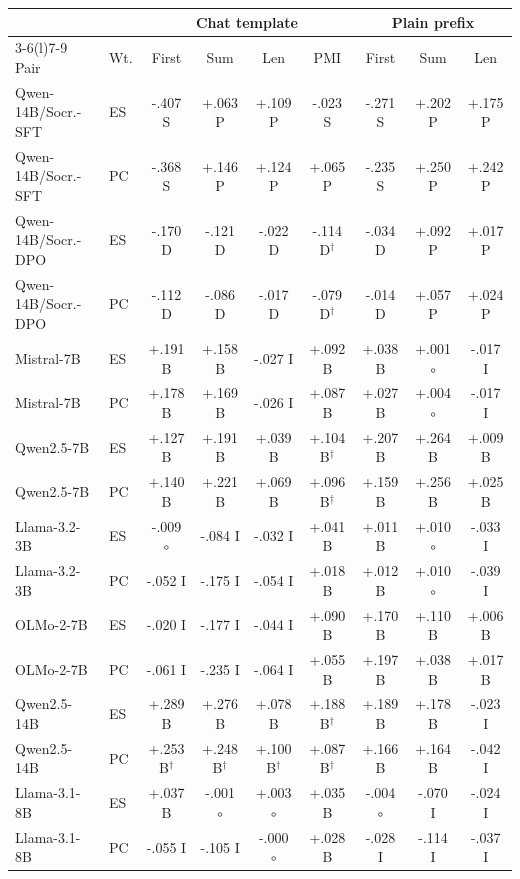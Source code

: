 \begin{table}[t]
\centering\scriptsize
\setlength{\tabcolsep}{3pt}
\begin{tabular}{@{}llccccccc@{}}
\toprule
& & \multicolumn{4}{c}{Chat template} & \multicolumn{3}{c}{Plain prefix} \\
\cmidrule(lr){3-6}\cmidrule(l){7-9}
Pair & Wt. & First & Sum & Len & PMI & First & Sum & Len \\
\midrule
Qwen-14B/Socr.-SFT & ES & -.407 S & +.063 P & +.109 P & -.023 S & -.271 S & +.202 P & +.175 P \\
Qwen-14B/Socr.-SFT & PC & -.368 S & +.146 P & +.124 P & +.065 P & -.235 S & +.250 P & +.242 P \\
Qwen-14B/Socr.-DPO & ES & -.170 D & -.121 D & -.022 D & -.114 D$^{\dagger}$ & -.034 D & +.092 P & +.017 P \\
Qwen-14B/Socr.-DPO & PC & -.112 D & -.086 D & -.017 D & -.079 D$^{\dagger}$ & -.014 D & +.057 P & +.024 P \\
Mistral-7B & ES & +.191 B & +.158 B & -.027 I & +.092 B & +.038 B & +.001 $\circ$ & -.017 I \\
Mistral-7B & PC & +.178 B & +.169 B & -.026 I & +.087 B & +.027 B & +.004 $\circ$ & -.017 I \\
Qwen2.5-7B & ES & +.127 B & +.191 B & +.039 B & +.104 B$^{\dagger}$ & +.207 B & +.264 B & +.009 B \\
Qwen2.5-7B & PC & +.140 B & +.221 B & +.069 B & +.096 B$^{\dagger}$ & +.159 B & +.256 B & +.025 B \\
Llama-3.2-3B & ES & -.009 $\circ$ & -.084 I & -.032 I & +.041 B & +.011 B & +.010 $\circ$ & -.033 I \\
Llama-3.2-3B & PC & -.052 I & -.175 I & -.054 I & +.018 B & +.012 B & +.010 $\circ$ & -.039 I \\
OLMo-2-7B & ES & -.020 I & -.177 I & -.044 I & +.090 B & +.170 B & +.110 B & +.006 B \\
OLMo-2-7B & PC & -.061 I & -.235 I & -.064 I & +.055 B & +.197 B & +.038 B & +.017 B \\
Qwen2.5-14B & ES & +.289 B & +.276 B & +.078 B & +.188 B$^{\dagger}$ & +.189 B & +.178 B & -.023 I \\
Qwen2.5-14B & PC & +.253 B$^{\dagger}$ & +.248 B$^{\dagger}$ & +.100 B$^{\dagger}$ & +.087 B$^{\dagger}$ & +.166 B & +.164 B & -.042 I \\
Llama-3.1-8B & ES & +.037 B & -.001 $\circ$ & +.003 $\circ$ & +.035 B & -.004 $\circ$ & -.070 I & -.024 I \\
Llama-3.1-8B & PC & -.055 I & -.105 I & -.000 $\circ$ & +.028 B & -.028 I & -.114 I & -.037 I \\

\end{tabular}
\end{table}
